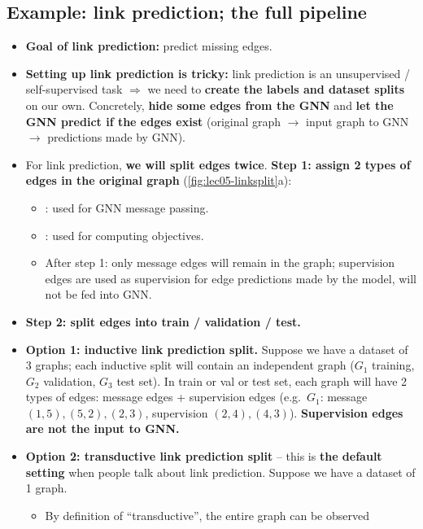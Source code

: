 \subsection{Example: link prediction; the full pipeline}\label{sec:lec05-link}

\begin{itemize}
  \item \textbf{Goal of link prediction:} predict missing edges.
  \item \textbf{Setting up link prediction is tricky:} link prediction is an
    unsupervised / self-supervised task $\Rightarrow$ we need to \textbf{create
    the labels and dataset splits} on our own. Concretely, \textbf{hide some
    edges from the GNN} and \textbf{let the GNN predict if the edges exist}
    (original graph $\to$ input graph to GNN $\to$ predictions made by GNN).
  \item For link prediction, \textbf{we will split edges twice}. \textbf{Step
    1: assign 2 types of edges in the original graph}
    (\cref{fig:lec05-linksplit}a):
    \begin{itemize}
      \item {}: used for GNN message passing.
      \item {}: used for computing objectives.
      \item After step 1: only message edges will remain in the graph;
        supervision edges are used as supervision for edge predictions made by
        the model, will not be fed into GNN.
    \end{itemize}
  \item \textbf{Step 2: split edges into train / validation / test.}
  \item \textbf{Option 1: inductive link prediction split.} Suppose we have a
    dataset of 3 graphs; each inductive split will contain an independent graph
    ($G_1$ training, $G_2$ validation, $G_3$ test set). In train or val or test
    set, each graph will have 2 types of edges: message edges + supervision
    edges (e.g.\ $G_1$: message $(1,5),(5,2),(2,3)$, supervision
    $(2,4),(4,3)$). \textbf{Supervision edges are not the input to GNN.}
  \item \textbf{Option 2: transductive link prediction split} -- this is
    \textbf{the default setting} when people talk about link prediction.
    Suppose we have a dataset of 1 graph.
    \begin{itemize}
      \item By definition of ``transductive'', the entire graph can be observed

\end{itemize}
\end{itemize}
